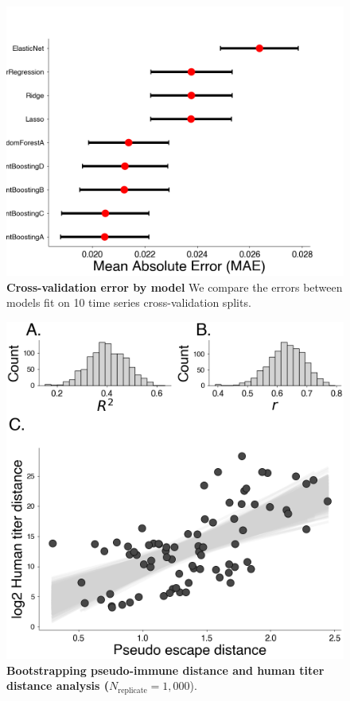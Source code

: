 \documentclass[11pt,oneside,letterpaper]{article}
\begin{document}
\begin{figure}[t!]
    \centering
    \includegraphics[width=1.0\textwidth=0.01]{./supplementary_figures/growth-rate-prediction-model-comparison.png}
    \caption{
      \textbf{Cross-validation error by model}
      We compare the errors between models fit on 10 time series cross-validation splits.
    }
    \label{fig:growth_rate_predictions_model_comparison}
\end{figure}

\begin{figure}[t!]
    \centering
    \includegraphics[width=1.0\textwidth=0.01]{./supplementary_figures/pseudo_escape_titer_correlation_bootstrap.png}
    \caption{
        \textbf{Bootstrapping pseudo-immune distance and human titer distance analysis ($N_{\text{replicate}}=1,000$}).
    }
    \label{fig:latent_immune_bootstrap}
\end{figure}
\end{document}
